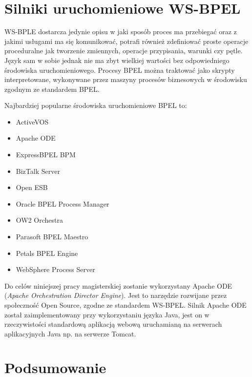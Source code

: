 
\section{Silniki uruchomieniowe WS-BPEL}
\label{sec:bpelEngines}

WS-BPLE dostarcza jedynie opisu w jaki sposób proces ma przebiegać oraz z jakimi usługami ma się komunikować, potrafi również zdefiniować proste operacje proceduralne jak tworzenie zmiennych, operacje przypisania, warunki czy pętle. Język sam w sobie jednak nie ma zbyt wielkiej wartości bez odpowiedniego środowiska uruchomieniowego. Procesy BPEL można traktować jako skrypty interpretowane, wykonywane przez maszyny procesów biznesowych w środowisku zgodnym ze standardem BPEL. 

Najbardziej popularne środowiska uruchomieniowe BPEL to:

\begin{itemize}
\item ActiveVOS 
\item Apache ODE
\item ExpressBPEL BPM
\item BizTalk Server
\item Open ESB
\item Oracle BPEL Process Manager
\item OW2 Orchestra
\item Parasoft BPEL Maestro
\item Petals BPEL Engine
\item WebSphere Process Server
\end{itemize}

Do celów niniejszej pracy magisterskiej zostanie wykorzystany Apache ODE (\textit{Apache Orchestration Director Engine}). Jest to narzędzie rozwijane przez społeczność Open Source, zgodne ze standardem WS-BPEL. Silnik Apache ODE został zaimplementowany przy wykorzystaniu języka Java, jest on w rzeczywistości standardową aplikacją webową uruchamianą na serwerach aplikacyjnych Java np. na serwerze Tomcat. 


\section{Podsumowanie}
\label{sec:bpelSummary}

